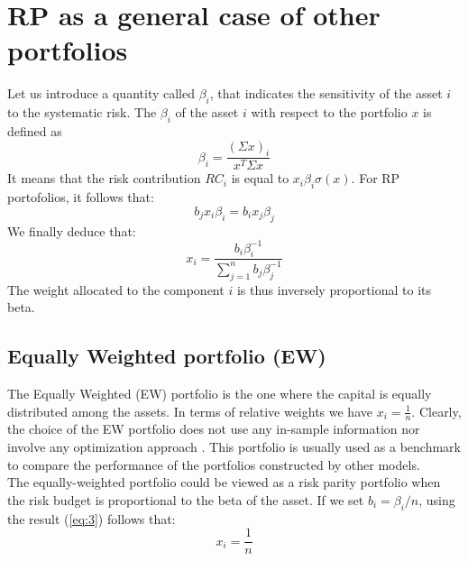 \section{RP as a general case of other portfolios}
Let us introduce a quantity called $\beta_i$, that indicates the sensitivity of the asset $i$ to the systematic risk. The $\beta_i$ of the asset $i$ with respect to the portfolio $x$ is defined as
\begin{equation}
\beta_i = \frac{(\Sigma x)_i}{x^T \Sigma x}
\end{equation}
It means that the risk contribution $RC_i$ is equal to $x_i\beta_i\sigma(x)$. For RP portofolios, it follows that:
\begin{equation}
b_j x_i \beta_i = b_i x_j \beta_j
\end{equation}
We finally deduce that:
\begin{equation}\label{eq:3}
x_i = \frac{b_i \beta_i^{-1}}{\sum_{j=1}^n b_j \beta_j^{-1}}
\end{equation}
The weight allocated to the component $i$ is thus inversely proportional to its beta.\\
\subsection{Equally Weighted portfolio (EW)}
The Equally Weighted (EW) portfolio is the one where the capital is equally distributed among the assets. In terms of relative weights we have $x_i=\frac{1}{n}$. Clearly, the choice of the EW portfolio does not use any in-sample information nor involve any optimization approach \cite{colucci}. This portfolio is usually used as a benchmark to compare the performance of the portfolios constructed by other models.\\
The equally-weighted portfolio could be viewed as a risk parity portfolio when the risk budget is proportional to the beta of the asset. If we set $b_i = \beta_i/n$, using the result (\ref{eq:3}) follows that:
\begin{equation*}
x_i = \frac{1}{n}
\end{equation*}

